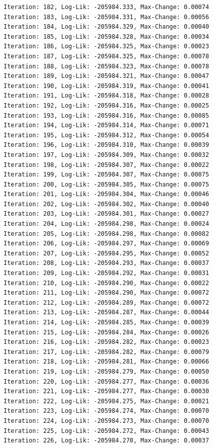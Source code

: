 \documentclass[
  letterpaper,
  DIV=11,
  numbers=noendperiod]{scrreport}
\begin{document}
\begin{verbatim}
Iteration: 182, Log-Lik: -205984.333, Max-Change: 0.00074
Iteration: 183, Log-Lik: -205984.331, Max-Change: 0.00056
Iteration: 184, Log-Lik: -205984.329, Max-Change: 0.00040
Iteration: 185, Log-Lik: -205984.328, Max-Change: 0.00034
Iteration: 186, Log-Lik: -205984.325, Max-Change: 0.00023
Iteration: 187, Log-Lik: -205984.325, Max-Change: 0.00078
Iteration: 188, Log-Lik: -205984.323, Max-Change: 0.00078
Iteration: 189, Log-Lik: -205984.321, Max-Change: 0.00047
Iteration: 190, Log-Lik: -205984.319, Max-Change: 0.00041
Iteration: 191, Log-Lik: -205984.318, Max-Change: 0.00028
Iteration: 192, Log-Lik: -205984.316, Max-Change: 0.00025
Iteration: 193, Log-Lik: -205984.316, Max-Change: 0.00085
Iteration: 194, Log-Lik: -205984.314, Max-Change: 0.00071
Iteration: 195, Log-Lik: -205984.312, Max-Change: 0.00054
Iteration: 196, Log-Lik: -205984.310, Max-Change: 0.00039
Iteration: 197, Log-Lik: -205984.309, Max-Change: 0.00032
Iteration: 198, Log-Lik: -205984.307, Max-Change: 0.00022
Iteration: 199, Log-Lik: -205984.307, Max-Change: 0.00075
Iteration: 200, Log-Lik: -205984.305, Max-Change: 0.00075
Iteration: 201, Log-Lik: -205984.304, Max-Change: 0.00046
Iteration: 202, Log-Lik: -205984.302, Max-Change: 0.00040
Iteration: 203, Log-Lik: -205984.301, Max-Change: 0.00027
Iteration: 204, Log-Lik: -205984.298, Max-Change: 0.00024
Iteration: 205, Log-Lik: -205984.298, Max-Change: 0.00082
Iteration: 206, Log-Lik: -205984.297, Max-Change: 0.00069
Iteration: 207, Log-Lik: -205984.295, Max-Change: 0.00052
Iteration: 208, Log-Lik: -205984.293, Max-Change: 0.00037
Iteration: 209, Log-Lik: -205984.292, Max-Change: 0.00031
Iteration: 210, Log-Lik: -205984.290, Max-Change: 0.00022
Iteration: 211, Log-Lik: -205984.290, Max-Change: 0.00072
Iteration: 212, Log-Lik: -205984.289, Max-Change: 0.00072
Iteration: 213, Log-Lik: -205984.287, Max-Change: 0.00044
Iteration: 214, Log-Lik: -205984.285, Max-Change: 0.00039
Iteration: 215, Log-Lik: -205984.284, Max-Change: 0.00026
Iteration: 216, Log-Lik: -205984.282, Max-Change: 0.00023
Iteration: 217, Log-Lik: -205984.282, Max-Change: 0.00079
Iteration: 218, Log-Lik: -205984.281, Max-Change: 0.00066
Iteration: 219, Log-Lik: -205984.279, Max-Change: 0.00050
Iteration: 220, Log-Lik: -205984.277, Max-Change: 0.00036
Iteration: 221, Log-Lik: -205984.277, Max-Change: 0.00030
Iteration: 222, Log-Lik: -205984.275, Max-Change: 0.00021
Iteration: 223, Log-Lik: -205984.274, Max-Change: 0.00070
Iteration: 224, Log-Lik: -205984.273, Max-Change: 0.00070
Iteration: 225, Log-Lik: -205984.272, Max-Change: 0.00043
Iteration: 226, Log-Lik: -205984.270, Max-Change: 0.00037

\end{verbatim}
\end{document}
